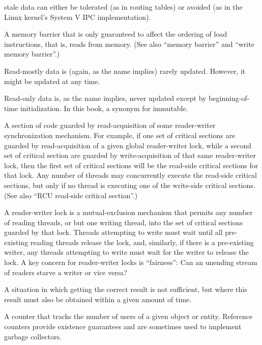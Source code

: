 \begin{description}
	stale data can either be tolerated (as in routing tables)
	or avoided (as in the Linux kernel's System V IPC implementation).
\item[\IXGh{Read}{Memory Barrier}:]
	A memory barrier that is only guaranteed to affect the ordering
	of load instructions, that is, reads from memory.
	(See also ``memory barrier'' and ``write memory barrier''.)
\item[\IXG{Read Mostly}:]
	Read-mostly data is (again, as the name implies) rarely updated.
	However, it might be updated at any time.
\item[\IXG{Read Only}:]
	Read-only data is, as the name implies, never updated except
	by beginning-of-time initialization.
	In this book, a synonym for immutable.
\item[\IXGh{Read-Side}{Critical Section}:]
	A section of code guarded by read-acquisition of
	some reader-writer synchronization mechanism.
	For example, if one set of critical sections are guarded by
	read-acquisition of
	a given global reader-writer lock, while a second set of critical
	section are guarded by write-acquisition of that same reader-writer
	lock, then the first set of critical sections will be the
	read-side critical sections for that lock.
	Any number of threads may concurrently execute the read-side
	critical sections, but only if no thread is executing one of
	the write-side critical sections.
	(See also ``RCU read-side critical section''.)
\item[\IXGh{Reader-Writer}{Lock}:]
	A reader-writer lock is a mutual-exclusion mechanism that
	permits any number of reading
	threads, or but one writing thread, into the set of critical
	sections guarded by that lock.
	Threads attempting to write must wait until all pre-existing
	reading threads release the lock, and, similarly, if there
	is a pre-existing writer, any threads attempting to write must
	wait for the writer to release the lock.
	A key concern for reader-writer locks is ``fairness'':
	Can an unending stream of readers starve a writer or vice versa?
\item[\IXG{Real Time}:]
	A situation in which getting the correct result is not sufficient,
	but where this result must also be obtained within a given amount
	of time.
\item[\IXG{Reference Count}:]
	A counter that tracks the number of users of a given object or
	entity.
	Reference counters provide existence guarantees and are sometimes
	used to implement garbage collectors.
\item[\IXG{Release Store}:]

\end{description}
